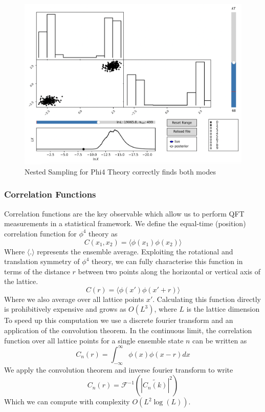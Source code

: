 \documentclass[11pt]{article}
\begin{document}
    \begin{figure}[H]
        \centering
        \includegraphics[width=0.75\linewidth]{../figures/phi4_anesthetic}
        \caption{Nested Sampling for Phi4 Theory correctly finds both modes}
        \label{fig:phi4anesthetic}
    \end{figure}

    \subsubsection{Correlation Functions}
    Correlation functions are the key observable which allow us to perform QFT measurements in a statistical framework.
    We define the equal-time (position) correlation function for $\phi^4$ theory as
    \[
        C(x_1, x_2) = \langle \phi(x_1) \phi(x_2) \rangle
    \]
    Where $\langle . \rangle$ represents the ensemble average.
    Exploiting the rotational and translation symmetry of $\phi^4$ theory, we can fully characterise this function
    in terms of the distance $r$ between two points along the horizontal or vertical axis of the lattice.
    \[
        C(r) = \langle \phi(x') \phi(x' + r) \rangle
    \]
    Where we also average over all lattice points $x'$.
    Calculating this function directly is prohibitively expensive and grows as $O(L^3)$, where $L$ is the lattice dimension\\

    To speed up this computation we use a discrete fourier transform and an application of the convolution theorem. \cite{Ruge_1994}
    In the continuous limit, the correlation function over all lattice points for a single ensemble state $n$ can be written as
    \[
        C_n(r) = \int_{-\infty}^{\infty} \phi(x) \phi(x - r) dx
    \]
    We apply the convolution theorem and inverse fourier transform to write
    \[
        C_n(r) = \mathcal{F}^{-1} \left( | \widetilde{C_n(k)} |^2 \right)
    \]
    Which we can compute with complexity $O(L^2 \log(L))$.
\end{document}
